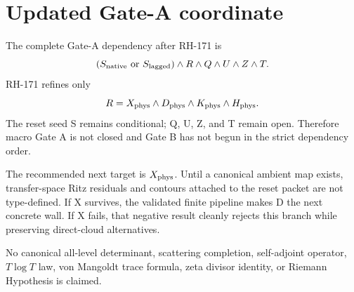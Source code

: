 \documentclass[12pt]{article}
\begin{document}
\section{Updated Gate-A coordinate}
The complete Gate-A dependency after RH-171 is
\[
 (S_{\rm native}\ \mathrm{or}\ S_{\rm lagged})
 \wedge R\wedge Q\wedge U\wedge Z\wedge T.
\]
RH-171 refines only
\[
 R=X_{\rm phys}\wedge D_{\rm phys}\wedge K_{\rm phys}\wedge H_{\rm phys}.
\]
The reset seed S remains conditional; Q, U, Z, and T remain open.  Therefore
macro Gate A is not closed and Gate B has not begun in the strict dependency
order.

The recommended next target is $X_{\rm phys}$.  Until a canonical ambient map
exists, transfer-space Ritz residuals and contours attached to the reset
packet are not type-defined.  If X survives, the validated finite pipeline
makes D the next concrete wall.  If X fails, that negative result cleanly
rejects this branch while preserving direct-cloud alternatives.

No canonical all-level determinant, scattering completion, self-adjoint
operator, $T\log T$ law, von Mangoldt trace formula, zeta divisor identity,
or Riemann Hypothesis is claimed.



\end{document}
